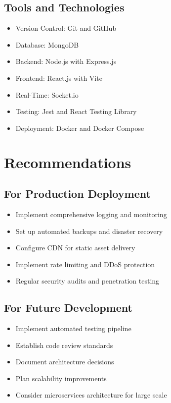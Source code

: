 \subsection{Tools and Technologies}
\begin{itemize}
    \item Version Control: Git and GitHub
    \item Database: MongoDB
    \item Backend: Node.js with Express.js
    \item Frontend: React.js with Vite
    \item Real-Time: Socket.io
    \item Testing: Jest and React Testing Library
    \item Deployment: Docker and Docker Compose
\end{itemize}

\section{Recommendations}

\subsection{For Production Deployment}
\begin{itemize}
    \item Implement comprehensive logging and monitoring
    \item Set up automated backups and disaster recovery
    \item Configure CDN for static asset delivery
    \item Implement rate limiting and DDoS protection
    \item Regular security audits and penetration testing
\end{itemize}

\subsection{For Future Development}
\begin{itemize}
    \item Implement automated testing pipeline
    \item Establish code review standards
    \item Document architecture decisions
    \item Plan scalability improvements
    \item Consider microservices architecture for large scale
\end{itemize}

